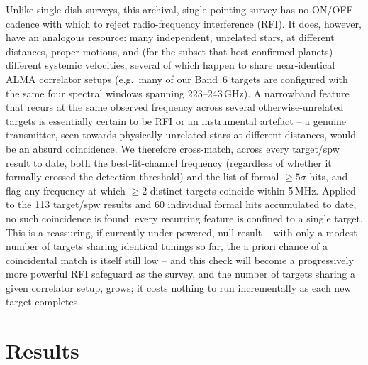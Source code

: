 \documentclass{openjournal}
\begin{document}
Unlike single-dish surveys, this archival, single-pointing survey has no
ON/OFF cadence with which to reject radio-frequency interference (RFI).
It does, however, have an analogous resource: many independent,
unrelated stars, at different distances, proper motions, and (for the
subset that host confirmed planets) different systemic velocities,
several of which happen to share near-identical ALMA correlator setups
(e.g.\ many of our Band~6 targets are configured with the same four
spectral windows spanning 223--243\,GHz). A narrowband feature that
recurs at the same observed frequency across several otherwise-unrelated
targets is essentially certain to be RFI or an instrumental artefact --
a genuine transmitter, seen towards physically unrelated stars at
different distances, would be an absurd coincidence. We therefore
cross-match, across every target/spw result to date, both the
best-fit-channel frequency (regardless of whether it formally crossed
the detection threshold) and the list of formal $\geq5\sigma$ hits, and
flag any frequency at which $\geq2$ distinct targets coincide within
5\,MHz. Applied to the 113 target/spw results and 60 individual formal
hits accumulated to date, no such coincidence is found: every recurring
feature is confined to a single target. This is a reassuring, if
currently under-powered, null result -- with only a modest number of
targets sharing identical tunings so far, the a priori chance of a
coincidental match is itself still low -- and this check will become a
progressively more powerful RFI safeguard as the survey, and the number
of targets sharing a given correlator setup, grows; it costs nothing to
run incrementally as each new target completes.

\section{Results}
\label{sec:results}
\end{document}

